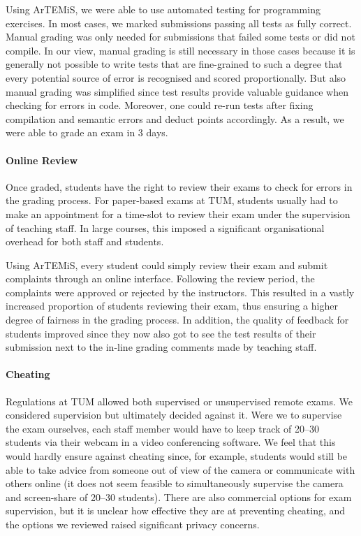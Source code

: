 Using ArTEMiS, we were able to use automated testing for programming exercises.
In most cases, we marked submissions passing all tests as fully correct.
Manual grading was only needed for submissions that failed some tests or did not compile.
In our view, manual grading is still necessary in those cases because it is generally not possible to write tests that are fine-grained to such a degree that every potential source of error is recognised and scored proportionally.
But also manual grading was simplified since test results provide valuable guidance when checking for errors in code.
Moreover, one could re-run tests after fixing compilation and semantic errors and deduct points accordingly.
As a result, we were able to grade an exam in 3 days.

\paragraph{Online Review}
Once graded, students have the right to review their
exams to check for errors in the grading process.
For paper-based exams at TUM, students usually had to make an
appointment for a time-slot to review their exam under
the supervision of teaching staff.
In large courses, this imposed a significant organisational overhead for both staff and students.

Using ArTEMiS, every student could simply review their exam and submit complaints through an online interface.
Following the review period,
the complaints were approved or rejected by the instructors.
This resulted in a vastly increased proportion of students reviewing their exam,
thus ensuring a higher degree of fairness in the grading process.
In addition, the quality of feedback for students improved
since
they now also got to see the test results of their submission next to the in-line grading comments made by
teaching staff.

\paragraph{Cheating}

Regulations at TUM allowed both supervised or unsupervised remote exams.
We considered supervision but ultimately decided against it. Were we to supervise the exam ourselves,
each staff member would have to keep track of 20--30 students via their webcam in a video conferencing software.
We feel that this would hardly ensure against cheating
since, for example, students would still be able to take advice from someone out of view of the camera or communicate with others online (it does not seem feasible to simultaneously supervise the camera and screen-share of 20--30 students).
There are also commercial options for exam supervision,
but it is unclear how effective they are at preventing cheating, and the options we reviewed raised significant privacy concerns.

